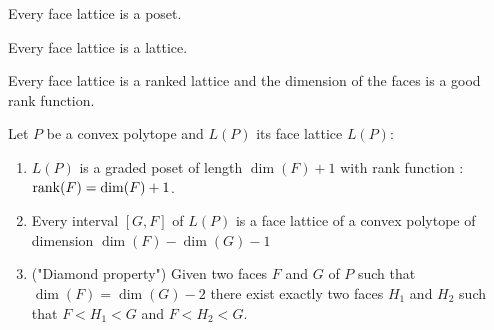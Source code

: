 \begin{proposition}
  Every face lattice is a poset.
\end{proposition}

\begin{proposition}
  Every face lattice is a lattice.
\end{proposition}

\begin{proposition}
  Every face lattice is a ranked lattice and the dimension of the faces is a good rank function.
\end{proposition}

\begin{proposition}

\end{proposition}

\begin{proposition}
  Let $P$ be a convex polytope and $L(P)$ its face lattice $L(P)$:

  \begin{enumerate}
    \item $L(P)$ is a graded poset of length $\dim(F) + 1$ with rank function : $\operatorname{rank}(F) = \dim(F) + 1$.
    \item Every interval $[G,F]$ of $L(P)$ is a face lattice of a convex polytope of dimension $\dim(F) - \dim(G) - 1$
    \item ("Diamond property") Given two faces $F$ and $G$ of $P$ such that $\dim(F) = \dim(G) - 2$ there exist exactly two faces $H_1$ and $H_2$ such that $F < H_1 < G$ and $F < H_2 < G$.
  \end{enumerate}
\end{proposition}
